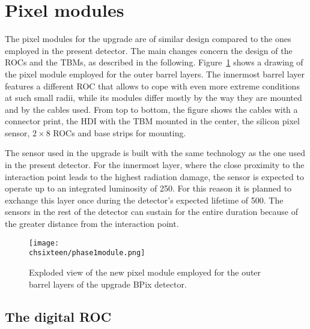 \section{Pixel modules}

The pixel modules for the upgrade are of similar design compared to the ones employed in the present detector. The main changes concern the design of the ROCs and the TBMs, as described in the following.
Figure~\ref{fig:Phase1Mod} shows a drawing of the pixel module employed for the outer barrel layers.
The innermost barrel layer features a different ROC that allows to cope with even more extreme conditions at such small radii, while its modules differ mostly by the way they are mounted and by the cables used.
From top to bottom, the figure shows the cables with a connector print, the HDI with the TBM mounted in the center, the silicon pixel sensor, $2\times8$ ROCs and base strips for mounting.

The sensor used in the upgrade is built with the same technology as the one used in the present detector. For the innermost layer, where the close proximity to the interaction point leads to the highest radiation damage, the sensor is expected to operate up to an integrated luminosity of 250\fbinv. For this reason it is planned to exchange this layer once during the detector's expected lifetime of 500\fbinv. The sensors in the rest of the detector can sustain for the entire duration because of the greater distance from the interaction point.

\begin{figure}[!htb]
 \begin{center}
 \texttt{[image: \\chsixteen/phase1module.png]}
 \end{center}
 \caption{Exploded view of the new pixel module employed for the outer barrel layers of the upgrade BPix detector.}
 \label{fig:Phase1Mod}
\end{figure}

\subsection{The digital ROC}

